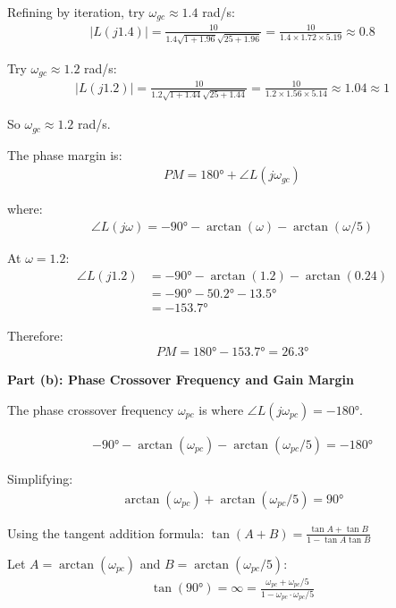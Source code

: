 \documentclass[11pt,a4paper]{article}
\begin{document}
Refining by iteration, try $\omega_{gc} \approx 1.4$ rad/s:
\begin{align}
  |L(j1.4)| = \frac{10}{1.4\sqrt{1+1.96}\sqrt{25+1.96}} = \frac{10}{1.4 \times 1.72 \times 5.19} \approx 0.8
\end{align}

Try $\omega_{gc} \approx 1.2$ rad/s:
\begin{align}
  |L(j1.2)| = \frac{10}{1.2\sqrt{1+1.44}\sqrt{25+1.44}} = \frac{10}{1.2 \times 1.56 \times 5.14} \approx 1.04 \approx 1
\end{align}

So $\omega_{gc} \approx 1.2$ rad/s.

The phase margin is:
\begin{align}
  PM = 180° + \angle L(j\omega_{gc})
\end{align}

where:
\begin{align}
  \angle L(j\omega) = -90° - \arctan(\omega) - \arctan(\omega/5)
\end{align}

At $\omega = 1.2$:
\begin{align}
  \angle L(j1.2) &= -90° - \arctan(1.2) - \arctan(0.24) \\
  &= -90° - 50.2° - 13.5° \\
  &= -153.7°
\end{align}

Therefore:
\begin{align}
  PM = 180° - 153.7° = 26.3°
\end{align}

\textbf{Part (b): Phase Crossover Frequency and Gain Margin}

The phase crossover frequency $\omega_{pc}$ is where $\angle L(j\omega_{pc}) = -180°$.

\begin{align}
  -90° - \arctan(\omega_{pc}) - \arctan(\omega_{pc}/5) = -180°
\end{align}

Simplifying:
\begin{align}
  \arctan(\omega_{pc}) + \arctan(\omega_{pc}/5) = 90°
\end{align}

Using the tangent addition formula: $\tan(A + B) = \frac{\tan A + \tan B}{1 - \tan A \tan B}$

Let $A = \arctan(\omega_{pc})$ and $B = \arctan(\omega_{pc}/5)$:
\begin{align}
  \tan(90°) = \infty = \frac{\omega_{pc} + \omega_{pc}/5}{1 - \omega_{pc} \cdot \omega_{pc}/5}
\end{align}
\end{document}
